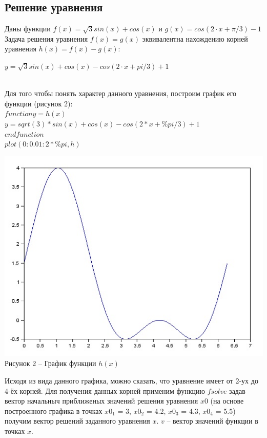 \documentclass[russian, utf8, nocolumnxxxi, nocolumnxxxii, 14pt]{eskdtext}
\begin{document}
\subsection{Решение уравнения}
Даны функции $f(x) = \sqrt{3}sin(x) + cos(x)$ и $g(x) = cos(2 \cdot x + \pi/3) - 1$ \\
\indent Задача решения уравнения $f(x) = g(x)$ эквивалентна нахождению корней уравнения $h(x) = f(x) - g(x)$:\\
\begin{center} $y = \sqrt{3}sin(x) + cos(x) - cos(2 \cdot x + pi/3) + 1$ \end{center}\\
\indent Для того чтобы понять характер данного уравнения, построим график его функции (рисунок 2):\\
$function y = h(x)$ \\
$y = sqrt(3) * sin(x) + cos(x) - cos(2*x + \%pi/3) + 1$ \\
$endfunction$ \\
$plot(0:0.01:2*\%pi,h)$ \\
\begin{center} 
\includegraphics[scale=0.8]{JPG/zwei.jpg}\\
Рисунок 2 -- График функции $h(x)$\\
\end{center}
\indent Исходя из вида данного графика, можно сказать, что уравнение имеет от 2-ух до 4-ёх корней. Для получения данных корней применим функцию $fsolve$ задав вектор начальныч приближеных значений решения уравнения $x0$ (на основе построенного графика в точках $x0_1$ = 3, $x0_2$ = 4.2, $x0_3$ = 4.3, $x0_4$ = 5.5) получим вектор решений заданного уравнения $x$. $v$ -- вектор значений функции в точках $x$. \\
\end{document}
